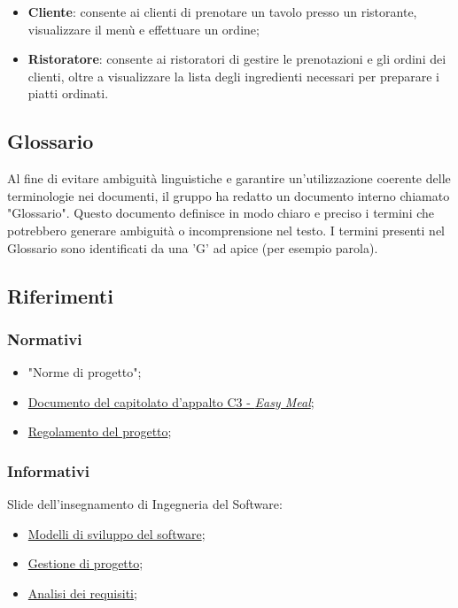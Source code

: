 \begin{itemize}
	\item \textbf{Cliente}: consente ai clienti di prenotare un tavolo presso un
	      ristorante, visualizzare il menù e effettuare un ordine;

	\item \textbf{Ristoratore}: consente ai ristoratori di gestire le
	      prenotazioni e gli ordini dei clienti, oltre a visualizzare la lista
	      degli ingredienti necessari per preparare i piatti ordinati.
\end{itemize}

\subsection{Glossario}

Al fine di evitare ambiguità linguistiche e garantire un'utilizzazione coerente
delle terminologie nei documenti, il gruppo ha redatto un documento interno
chiamato "Glossario". Questo documento definisce in modo chiaro e preciso i
termini che potrebbero generare ambiguità o incomprensione nel testo. I termini
presenti nel Glossario sono identificati da una 'G' ad apice (per esempio
parola\g).

\subsection{Riferimenti}

\subsubsection{Normativi}
\begin{itemize}
	\item "Norme di progetto";
	\item 	\href{https://www.math.unipd.it/~tullio/IS-1/2023/Progetto/C3.pdf}
	      {Documento del capitolato d'appalto C3 - \textit{Easy Meal}};
	\item \href{https://www.math.unipd.it/~tullio/IS-1/2023/Dispense/PD2.pdf}
	      {Regolamento del progetto};
\end{itemize}

\subsubsection{Informativi}

Slide dell'insegnamento di Ingegneria del Software:
\begin{itemize}
	\item \href{https://www.math.unipd.it/~tullio/IS-1/2023/Dispense/T3.pdf}
	      {Modelli di sviluppo del software};
	\item \href{https://www.math.unipd.it/~tullio/IS-1/2023/Dispense/T4.pdf}
	      {Gestione di progetto};
	\item \href{https://www.math.unipd.it/~tullio/IS-1/2023/Dispense/T5.pdf}
	      {Analisi dei requisiti};
\end{itemize}

